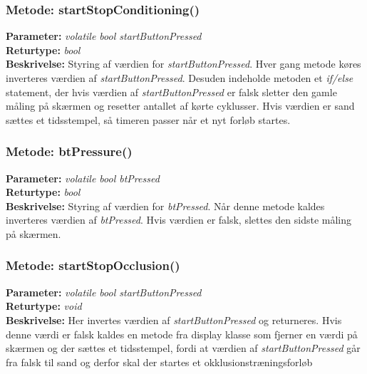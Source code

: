 \subsubsection{Metode: startStopConditioning()}
\textbf{Parameter: } \textit{volatile bool startButtonPressed}
\\ \textbf{Returtype: } \textit{bool}
\\ \textbf{Beskrivelse: } Styring af værdien for \textit{startButtonPressed}. Hver gang metode køres inverteres værdien af \textit{startButtonPressed}. Desuden indeholde metoden et \textit{if/else} statement, der hvis værdien af \textit{startButtonPressed} er falsk sletter den gamle måling på skærmen og resetter antallet af kørte cyklusser. Hvis værdien er sand sættes et tidsstempel, så timeren passer når et nyt forløb startes.  

\subsubsection{Metode: btPressure()}
\textbf{Parameter: } \textit{volatile bool btPressed}
\\ \textbf{Returtype: } \textit{bool}
\\ \textbf{Beskrivelse: } Styring af værdien for \textit{btPressed}. Når denne metode kaldes inverteres værdien af \textit{btPressed}. Hvis værdien er falsk, slettes den sidste måling på skærmen.

\subsubsection{Metode: startStopOcclusion()}
\textbf{Parameter: } \textit{volatile bool startButtonPressed}
\\ \textbf{Returtype: } \textit{void}
\\ \textbf{Beskrivelse: } Her invertes værdien af \textit{startButtonPressed} og returneres. Hvis denne værdi er falsk kaldes en metode fra display klasse som fjerner en værdi på skærmen og der sættes et tidsstempel, fordi at værdien af \textit{startButtonPressed} går fra falsk til sand og derfor skal der startes et okklusionstræningsforløb 

